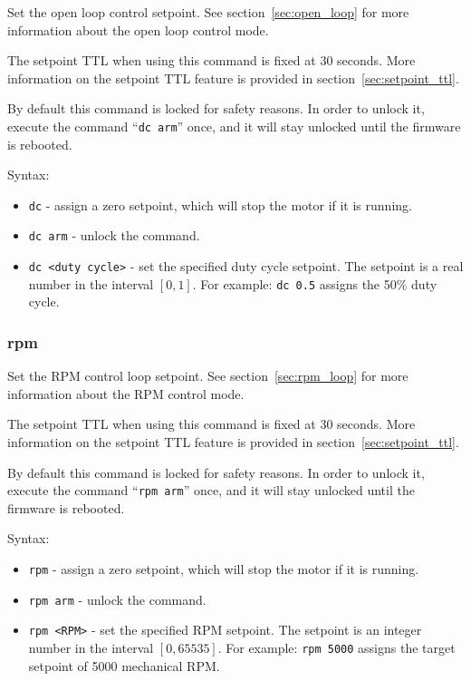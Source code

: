 \documentclass{zubaxdoc}
\begin{document}
Set the open loop control setpoint.
See section~\ref{sec:open_loop} for more information about the open loop control mode.

The setpoint TTL when using this command is fixed at 30 seconds.
More information on the setpoint TTL feature is provided in section~\ref{sec:setpoint_ttl}.

By default this command is locked for safety reasons.
In order to unlock it, execute the command
``\verb|dc arm|'' once, and it will stay unlocked until the firmware is rebooted.

Syntax:
\begin{itemize}
	\item \verb|dc| - assign a zero setpoint, which will stop the motor if it is running.
	\item \verb|dc arm| - unlock the command.
	\item \verb|dc <duty cycle>| - set the specified duty cycle setpoint.
	The setpoint is a real number in the interval $\left[0, 1\right]$.
	For example: \verb|dc 0.5| assigns the 50\% duty cycle.
\end{itemize}

\subsubsection{rpm}

Set the RPM control loop setpoint.
See section~\ref{sec:rpm_loop} for more information about the RPM control mode.

The setpoint TTL when using this command is fixed at 30 seconds.
More information on the setpoint TTL feature is provided in section~\ref{sec:setpoint_ttl}.

By default this command is locked for safety reasons.
In order to unlock it, execute the command
``\verb|rpm arm|'' once, and it will stay unlocked until the firmware is rebooted.

Syntax:
\begin{itemize}
	\item \verb|rpm| - assign a zero setpoint, which will stop the motor if it is running.
	\item \verb|rpm arm| - unlock the command.
	\item \verb|rpm <RPM>| - set the specified RPM setpoint.
	The setpoint is an integer number in the interval $\left[0, 65535\right]$.
	For example: \verb|rpm 5000| assigns the target setpoint of 5000 mechanical RPM.
\end{itemize}
\end{document}
